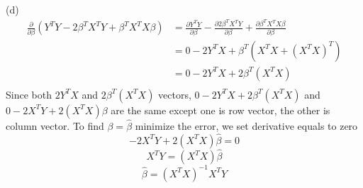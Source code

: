 \documentclass[12pt]{article}
\begin{document}
(d)\\
\begin{equation}
\begin{split}
\frac{\partial}{\partial \beta}( Y^TY - 2\beta^TX^TY + \beta^TX^TX\beta)
& = \frac{\partial  Y^TY}{\partial \beta} - \frac{\partial 2\beta^TX^TY}{\partial \beta} +  \frac{\partial  \beta^TX^TX\beta}{\partial \beta}\\
& = 0 - 2Y^TX + \beta^T(X^TX + (X^TX)^T)\\
& = 0 - 2Y^TX + 2\beta^T(X^TX)\\
\end{split}
\end{equation}
Since both $2Y^TX$ and $2\beta^T(X^TX)$ vectors, $0 - 2Y^TX + 2\beta^T(X^TX)$ and $0 - 2X^TY + 2(X^TX)\beta$ are the same except one is row vector, the other is column vector. To find $\beta=\hat{\beta}$ minimize the error, we set derivative equals to zero\\
$$- 2X^TY + 2(X^TX)\hat{\beta} = 0$$
$$X^TY = (X^TX)\hat{\beta}$$
$$\hat{\beta} = (X^TX)^{-1}X^TY$$
\clearpage
\end{document}
